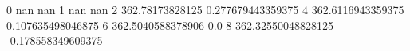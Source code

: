 0 nan nan
1 nan nan
2 362.78173828125 0.277679443359375
4 362.6116943359375 0.107635498046875
6 362.5040588378906 0.0
8 362.32550048828125 -0.178558349609375

